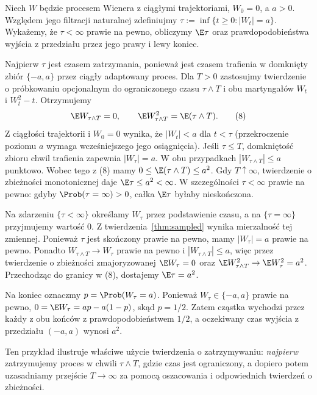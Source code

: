 \begin{zadanie}
Niech $W$ będzie procesem Wienera z ciągłymi trajektoriami,
$W_0=0$, a $a>0$. Względem jego filtracji naturalnej
zdefiniujmy
$\tau:=\inf\{t\ge0:|W_t|=a\}$.
Wykażemy, że $\tau<\infty$ prawie na pewno,
obliczymy $\E\tau$ oraz prawdopodobieństwa
wyjścia z przedziału przez jego prawy i lewy koniec.

Najpierw $\tau$ jest czasem zatrzymania,
ponieważ jest czasem trafienia w domknięty zbiór
$\{-a,a\}$ przez ciągły adaptowany proces.
Dla $T>0$ zastosujmy twierdzenie o próbkowaniu
opcjonalnym do ograniczonego czasu
$\tau\wedge T$ i obu martyngałów
$W_t$ i $W_t^2-t$. Otrzymujemy
\[
\E W_{\tau\wedge T}=0,
\qquad \E W_{\tau\wedge T}^2=\E(\tau\wedge T).
\tag{8}
\]
Z ciągłości trajektorii i $W_0=0$ wynika, że
$|W_t|<a$ dla $t<\tau$ (przekroczenie poziomu $a$
wymaga wcześniejszego jego osiągnięcia).
Jeśli $\tau\le T$, domkniętość zbioru chwil trafienia
zapewnia $|W_\tau|=a$. W obu przypadkach
$|W_{\tau\wedge T}|\le a$ punktowo. Wobec tego z (8) mamy
$0\le\E(\tau\wedge T)\le a^2$.
Gdy $T\uparrow\infty$, twierdzenie o zbieżności
monotonicznej daje $\E\tau\le a^2<\infty$.
W szczególności $\tau<\infty$ prawie na pewno:
gdyby $\Prob(\tau=\infty)>0$, całka $\E\tau$
byłaby nieskończona.

Na zdarzeniu $\{\tau<\infty\}$ określamy
$W_\tau$ przez podstawienie czasu, a na
$\{\tau=\infty\}$ przyjmujemy wartość $0$.
Z twierdzenia~\ref{thm:sampled} wynika mierzalność
tej zmiennej. Ponieważ $\tau$ jest skończony prawie
na pewno, mamy $|W_\tau|=a$ prawie na pewno.
Ponadto $W_{\tau\wedge T}\to W_\tau$ prawie na pewno
i $|W_{\tau\wedge T}|\le a$, więc przez twierdzenie o zbieżności
zmajoryzowanej $\E W_\tau=0$ oraz
$\E W_{\tau\wedge T}^2\to\E W_\tau^2=a^2$.
Przechodząc do granicy w (8), dostajemy
$\E\tau=a^2$.

Na koniec oznaczmy $p=\Prob(W_\tau=a)$.
Ponieważ $W_\tau\in\{-a,a\}$ prawie na pewno,
$0=\E W_\tau=ap-a(1-p)$, skąd $p=1/2$.
Zatem cząstka wychodzi przez każdy z obu końców z
prawdopodobieństwem $1/2$, a oczekiwany czas wyjścia
z przedziału $(-a,a)$ wynosi $a^2$.

Ten przykład ilustruje właściwe użycie twierdzenia
o zatrzymywaniu: \emph{najpierw} zatrzymujemy proces
w chwili $\tau\wedge T$, gdzie czas jest ograniczony,
a dopiero potem uzasadniamy przejście $T\to\infty$
za pomocą oszacowania i odpowiednich twierdzeń
o zbieżności.
\end{zadanie}

